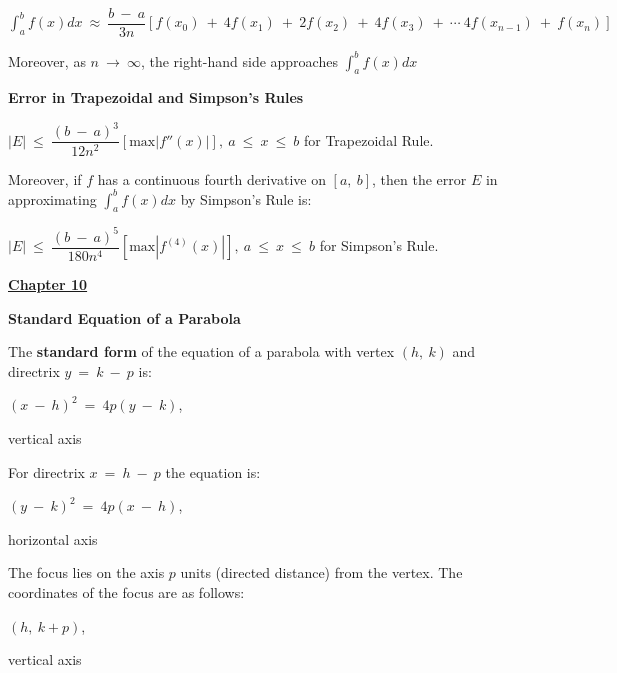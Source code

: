 \documentclass{article}
\begin{document}
\begin{large}
\hspace{0.2in} $\int^{b}_{a}f(x)dx\ \approx\ \dfrac{b\ -\ a}{3n}[f(x_{0})\ +\ 4f(x_{1})\ +\ 2f(x_{2})\ +\ 4f(x_{3})\ +\ \cdots\ 4f(x_{n-1})\ +\ f(x_{n})]$

\hspace{0.1in} Moreover, as $n\ \rightarrow\ \infty$, the right-hand side approaches $\displaystyle\int^{b}_{a}f(x)dx$

\textbf{Error in Trapezoidal and Simpson's Rules}

\hspace{0.2in} $|E|\ \leq\ \dfrac{(b\ -\ a)^{3}}{12n^{2}}[\text{max}|f''(x)|],\ a\ \leq\ x\ \leq\ b$ for Trapezoidal Rule.

\hspace{0.1in} Moreover, if $f$ has a continuous fourth derivative on $[a,\ b]$, then the error $E$ in approximating $\displaystyle\int^{b}_{a}f(x)dx$ by Simpson's Rule is:

\hspace{0.2in} $|E|\ \leq\ \dfrac{(b\ -\ a)^{5}}{180n^{4}}[\text{max}|f^{(4)}(x)|],\ a\ \leq\ x\ \leq\ b$ for Simpson's Rule.

\newpage

\underline{\textbf{\huge Chapter 10 \phantom{ } \phantom{ } \phantom{ } \phantom{ }}}

\textbf{Standard Equation of a Parabola}

\hspace{0.1in}  The \textbf{standard form} of the equation of a parabola with vertex $(h,\ k)$ and directrix $y\ =\ k\ -\ p$ is:

\vspace{-0.4in}
\hspace{2.0in} $(x\ -\ h)^{2}\ =\ 4p(y\ -\ k)$, \begin{Large} vertical axis \end{Large}

\hspace{0.1in} For directrix $x\ =\ h\ -\ p$ the equation is:

\hspace{2.0in} $(y\ -\ k)^{2}\ =\ 4p(x\ -\ h)$, \begin{Large} horizontal axis \end{Large}

\hspace{0.1in} The focus lies on the axis $p$ units (directed distance) from the vertex.  The coordinates of the focus are as follows:

\hspace{2.5in} $(h,\ k+p)$, \begin{Large} vertical axis \end{Large} 


\end{large}
\end{document}
